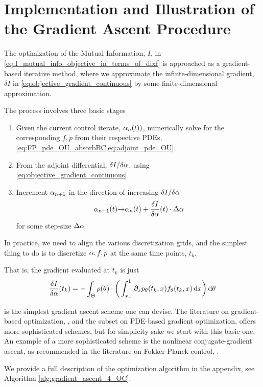 \documentclass{article}
\begin{document}
\section{Implementation and Illustration of the Gradient Ascent Procedure}
\label{sec:gradient_ascent}
The optimization of the Mutual Information, $I$, in
\cref{eq:I_mutual_info_objective_in_terms_of_dixf} is approached as a gradient-based iterative method, where we approximate the
infinte-dimensional gradient, $\delta I$ in
\cref{eq:objective_gradient_continuous} by some finite-dimensional
approximation. 

The process involves three basic stages
\begin{enumerate}
  \item Given the current control iterate, ${\alpha}_n(t))$, numerically solve for the
  corresponding $f,p$ from their respective PDEs,
  \cref{eq:FP_pde_OU_absorbBC,eq:adjoint_pde_OU}.
  \item From the adjoint differential,
  $\delta I / \delta {\alpha}$, using \cref{eq:objective_gradient_continuous}
  \item Increment ${\alpha}_{n+1}$ in the direction of increasing $\delta I / \delta
  {\alpha}$
  \begin{equation}
{\alpha}_{n+1}(t) {\rightarrow} {\alpha}_n(t) + \frac {\delta I }{\delta {\alpha}} (t) \cdot \Delta {\alpha}
\label{eq:simple_gradient_ascent_increment}
\end{equation}
for some step-size $\Delta {\alpha}$.
\end{enumerate}

In practice, we need to align the various discretization grids, and the simplest
thing to do is to discretize ${\alpha},f,p$ at the same time points, $t_k$.

That is, the gradient evaluated at $t_k$ is just $$ 
\frac {\delta I }{\delta {\alpha}}(t_k) =   
	-\int_\Theta  \rho({\theta}) \cdot \bigg(  
	\int_{ x_{-} }^{1} {\partial}_x p_{\theta}(t_k,x) f_{\theta}(t_k,x) \, \mathrm{d} x    
	    \bigg) \, \mathrm{d} {\theta}
$$

 is the simplest gradient ascent
scheme one can devise. The literature on gradient-based optimization,
\cite{Nocedal1999}, and the subset on PDE-based gradient optimization,
\cite{Borzi2012} offers more sophisticated schemes, but for simplicity
sake we start with this basic one. An example of a more sophisticated scheme
is the nonlinear conjugate-gradient ascent, as recommended in the literature on
Fokker-Planck control, \cite{Annunziato2013}.
 
We provide a full description of the optimization algorithm in the appendix, see
Algorithm \ref{alg:gradient_ascent_4_OC}.
\end{document}
